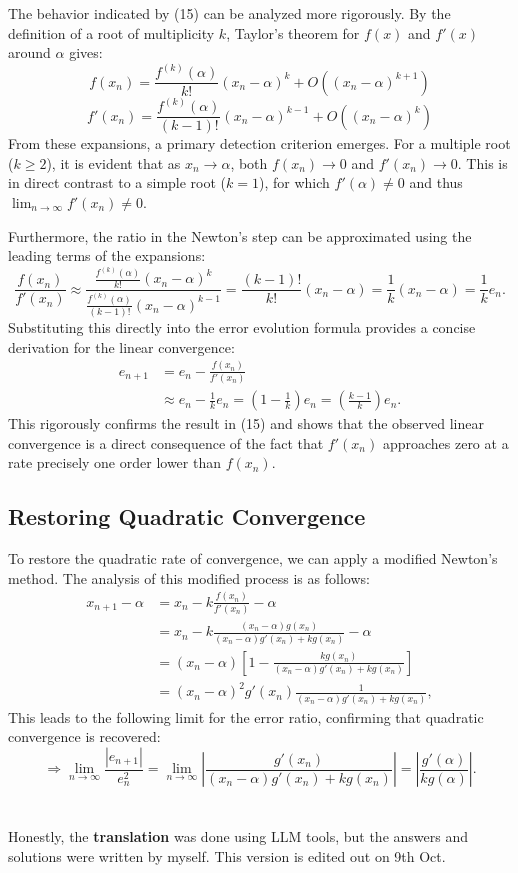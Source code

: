 \documentclass[a4paper]{article}
\begin{document}
The behavior indicated by (15) can be analyzed more rigorously. By the definition of a root of multiplicity $k$, Taylor's theorem for $f(x)$ and $f'(x)$ around $\alpha$ gives:
$$
f(x_n) = \frac{f^{(k)}(\alpha)}{k!}(x_n-\alpha)^k + O\left((x_n-\alpha)^{k+1}\right)
$$
$$
f'(x_n) = \frac{f^{(k)}(\alpha)}{(k-1)!}(x_n-\alpha)^{k-1} + O\left((x_n-\alpha)^{k}\right)
$$
From these expansions, a primary detection criterion emerges. For a multiple root ($k \ge 2$), it is evident that as $x_n \to \alpha$, both $f(x_n) \to 0$ and $f'(x_n) \to 0$. This is in direct contrast to a simple root ($k=1$), for which $f'(\alpha) \ne 0$ and thus $\lim_{n\to\infty} f'(x_n) \ne 0$.

Furthermore, the ratio in the Newton's step can be approximated using the leading terms of the expansions:
$$
\frac{f(x_n)}{f'(x_n)} \approx \frac{\frac{f^{(k)}(\alpha)}{k!}(x_n-\alpha)^k}{\frac{f^{(k)}(\alpha)}{(k-1)!}(x_n-\alpha)^{k-1}} = \frac{(k-1)!}{k!}(x_n-\alpha) = \frac{1}{k}(x_n-\alpha) = \frac{1}{k}e_n.
$$
Substituting this directly into the error evolution formula provides a concise derivation for the linear convergence:
\begin{align*}
e_{n+1} &= e_n - \frac{f(x_n)}{f'(x_n)} \\
&\approx e_n - \frac{1}{k}e_n = \left(1 - \frac{1}{k}\right)e_n = \left(\frac{k-1}{k}\right)e_n.
\end{align*}
This rigorously confirms the result in (15) and shows that the observed linear convergence is a direct consequence of the fact that $f'(x_n)$ approaches zero at a rate precisely one order lower than $f(x_n)$.

\subsection*{Restoring Quadratic Convergence}
To restore the quadratic rate of convergence, we can apply a modified Newton's method. The analysis of this modified process is as follows:
\begin{align*}
x_{n+1} - \alpha &= x_n - k\frac{f(x_n)}{f'(x_n)} - \alpha \\
&= x_n - k\frac{(x_n - \alpha)g(x_n)}{(x_n - \alpha)g'(x_n) + kg(x_n)} - \alpha\\
&= (x_n - \alpha)\left[1 - \frac{kg(x_n)}{(x_n - \alpha)g'(x_n) + kg(x_n)}\right] \\
&= (x_n - \alpha)^2  g'(x_n)  \frac{1}{(x_n - \alpha)g'(x_n) + kg(x_n)},
\end{align*}
This leads to the following limit for the error ratio, confirming that quadratic convergence is recovered:
$$
\Rightarrow \lim_{n\to\infty} \frac{|e_{n+1}|}{e_n^2} = \lim_{n\to\infty} \left|\frac{g'(x_n)}{(x_n - \alpha)g'(x_n) + kg(x_n)}\right| = \left|\frac{g'(\alpha)}{kg(\alpha)}\right|.
$$





\section*{  }
Honestly, the \textbf{translation} was done using LLM tools, but the answers and solutions were written by myself.
This version is edited out on 9th Oct.


\end{document}
